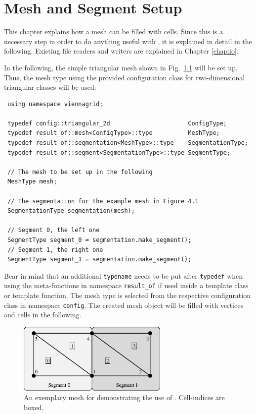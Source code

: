 \chapter{Mesh and Segment Setup} \label{chap:meshsetup}

This chapter explains how a {\ViennaGrid} mesh can be filled with cells. Since this
is a necessary step in order to do anything useful with {\ViennaGrid}, it is explained in detail in the following.
Existing file readers and writers are explained in Chapter \ref{chap:io}.


In the following, the simple triangular mesh shown in Fig.~\ref{fig:samplemesh} will be set up.
Thus, the mesh type using the provided configuration class for two-dimensional triangular classes will be used:
\begin{lstlisting}
 using namespace viennagrid;

 typedef config::triangular_2d                      ConfigType;
 typedef result_of::mesh<ConfigType>::type          MeshType;
 typedef result_of::segmentation<MeshType>::type    SegmentationType;
 typedef result_of::segment<SegmentationType>::type SegmentType;

 // The mesh to be set up in the following
 MeshType mesh;

 // The segmentation for the example mesh in Figure 4.1
 SegmentationType segmentation(mesh);

 // Segment 0, the left one
 SegmentType segment_0 = segmentation.make_segment();
 // Segment 1, the right one
 SegmentType segment_1 = segmentation.make_segment();
\end{lstlisting}
Bear in mind that an additional \lstinline|typename| needs to be put after \lstinline|typedef| when using the meta-functions in namespace \lstinline|result_of| if used inside a template class or template function.
The mesh type is selected from the respective configuration class in namespace \texttt{config}.
The created mesh object will be filled with vertices and cells in the following.

\begin{figure}[tb]
\centering
 \includegraphics[width=0.65\textwidth]{figures/samplemesh.eps}
 \caption{An exemplary mesh for demonstrating the use of {\ViennaGrid}. Cell-indices are boxed.}
 \label{fig:samplemesh}
\end{figure}

